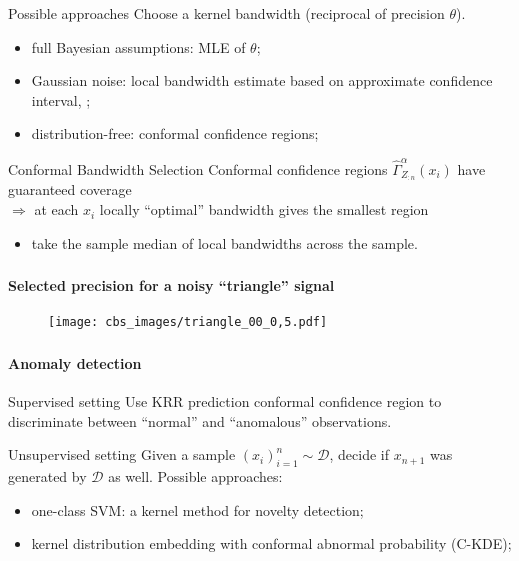 \documentclass[t]{beamer}  %
\newcommand{\Dcal}{\mathcal{D}}
\begin{document}
\begin{frame}[c]\frametitle{\insertsection}
  \framesubtitle{\insertsubsection}
  \begin{block}{Possible approaches}
    Choose a kernel bandwidth (reciprocal of precision $\theta$).

    \begin{itemize}
      \item full Bayesian assumptions: MLE of $\theta$;
      \item Gaussian noise: local bandwidth estimate based on approximate
        confidence interval, \cite{goldenshluger1997};
      \item distribution-free: conformal confidence regions;
    \end{itemize}
  \end{block}

  \begin{block}{Conformal Bandwidth Selection}
    Conformal confidence regions $\hat{\Gamma}_{Z_{:n}}^\alpha(x_i)$ have guaranteed
    coverage\hfill\\ $\Rightarrow$ at each $x_i$ locally ``optimal'' bandwidth gives
    the smallest region \begin{itemize}
      \item take the sample median of local bandwidths across the sample.
    \end{itemize}
  \end{block}
\end{frame}

\begin{frame}[t]\frametitle{\insertsection}
  \framesubtitle{Selected precision for a noisy ``triangle'' signal}
  \begin{figure}%
    \centering
    \texttt{[image: cbs\_images/triangle\_00\_0,5.pdf]}
  \end{figure}
\end{frame}


\begin{frame}[t]\frametitle{\insertsection}
  \framesubtitle{Anomaly detection}
  \begin{block}{Supervised setting}
    Use KRR prediction conformal confidence region to discriminate between
    ``normal'' and ``anomalous'' observations.
  \end{block}

  \begin{block}{Unsupervised setting}
    Given a sample $(x_i)_{i=1}^n\sim \Dcal$, decide if $x_{n+1}$ was generated
    by $\Dcal$ as well. Possible approaches:
    \begin{itemize}
      \item one-class SVM: a kernel method for novelty detection;
      \item kernel distribution embedding with conformal abnormal probability (C-KDE);
    \end{itemize}
  \end{block}
\end{frame}
\end{document}
